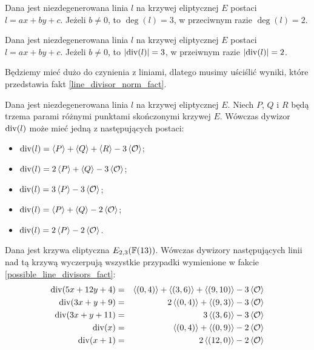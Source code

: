 \begin{fact}\label{line_deg_fact}
Dana jest niezdegenerowana linia $l$ na krzywej eliptycznej $E$
postaci $l = ax + by + c$.
Jeżeli $b \neq 0$, to $\deg(l) = 3$,
w przeciwnym razie $\deg(l) = 2$.
\end{fact}

\begin{fact}\label{line_divisor_norm_fact}
Dana jest niezdegenerowana linia $l$ na krzywej eliptycznej $E$
postaci $l = ax + by + c$.
Jeżeli $b \neq 0$, to $\lvert\operatorname{div}(l)\rvert = 3$,
w przeiwnym razie $\lvert\operatorname{div}(l)\rvert = 2$.
\end{fact}

\noindent
Będziemy mieć dużo do czynienia z liniami,
dlatego musimy uściślić wyniki,
które przedstawia fakt \ref{line_divisor_norm_fact}.

\begin{fact}\label{possible_line_divisors_fact}
Dana jest niezdegenerowana linia $l$ na krzywej eliptycznej $E$.
Niech $P$, $Q$ i $R$ będą
trzema parami różnymi punktami skończonymi krzywej $E$.
Wówczas dywizor $\operatorname{div}(l)$ może mieć jedną z następujących postaci:
\begin{itemize}
\item $\operatorname{div}(l) = \left\langle P\right\rangle + \left\langle Q\right\rangle + \left\langle R\right\rangle - 3\left\langle\mathcal{O}\right\rangle$;
\item $\operatorname{div}(l) = 2\left\langle P\right\rangle + \left\langle Q\right\rangle - 3\left\langle\mathcal{O}\right\rangle$;
\item $\operatorname{div}(l) = 3\left\langle P\right\rangle - 3\left\langle\mathcal{O}\right\rangle$;
\item $\operatorname{div}(l) = \left\langle P\right\rangle + \left\langle Q\right\rangle - 2\left\langle\mathcal{O}\right\rangle$;
\item $\operatorname{div}(l) = 2\left\langle P\right\rangle - 2\left\langle\mathcal{O}\right\rangle$.
\end{itemize}
\end{fact}

\begin{example}
Dana jest krzywa eliptyczna $E_{2,3}(\mathbb{F}(13))$.
Wówczas dywizory następujących linii nad tą krzywą
wyczerpują wszystkie przypadki wymienione w fakcie
\ref{possible_line_divisors_fact}:
\begin{eqnarray*}
\operatorname{div}(5x + 12y + 4)
& = &
\left\langle(0, 4)\right\rangle + \left\langle(3, 6)\right\rangle + \left\langle(9, 10)\right\rangle - 3\left\langle\mathcal{O}\right\rangle
\\
\operatorname{div}(3x + y + 9)
& = &
2\left\langle(0, 4)\right\rangle + \left\langle(9, 3)\right\rangle - 3\left\langle\mathcal{O}\right\rangle
\\
\operatorname{div}(3x + y + 11)
& = &
3\left\langle(3, 6)\right\rangle - 3\left\langle\mathcal{O}\right\rangle
\\
\operatorname{div}(x)
& = &
\left\langle(0, 4)\right\rangle + \left\langle(0, 9)\right\rangle - 2\left\langle\mathcal{O}\right\rangle
\\
\operatorname{div}(x + 1)
& = &
2\left\langle(12, 0)\right\rangle - 2\left\langle\mathcal{O}\right\rangle
\end{eqnarray*}
\end{example}

